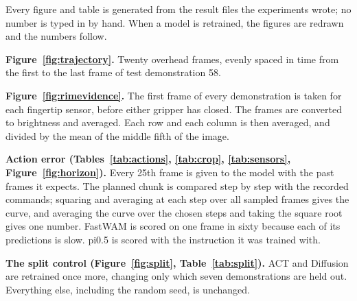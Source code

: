 Every figure and table is generated from the result files the experiments
wrote; no number is typed in by hand. When a model is retrained, the figures
are redrawn and the numbers follow.

\textbf{Figure~\ref{fig:trajectory}.} Twenty overhead frames, evenly spaced
in time from the first to the last frame of test demonstration 58.

\textbf{Figure~\ref{fig:rimevidence}.} The first frame of every
demonstration is taken for each fingertip sensor, before either gripper has
closed. The frames are converted to brightness and averaged. Each row and each
column is then averaged, and divided by the mean of the middle fifth of the
image.




\textbf{Action error (Tables~\ref{tab:actions}, \ref{tab:crop},
\ref{tab:sensors}, Figure~\ref{fig:horizon}).} Every 25th frame is given to
the model with the past frames it expects. The planned chunk is compared step by
step with the recorded commands; squaring and averaging at each step over all
sampled frames gives the curve, and averaging the curve over the chosen steps
and taking the square root gives one number. FastWAM is scored on one frame in
sixty because each of its predictions is slow. pi0.5 is scored with the
instruction it was trained with.

\textbf{The split control (Figure~\ref{fig:split}, Table~\ref{tab:split}).} ACT
and Diffusion are retrained once more, changing only which seven demonstrations
are held out. Everything else, including the random seed, is unchanged.

